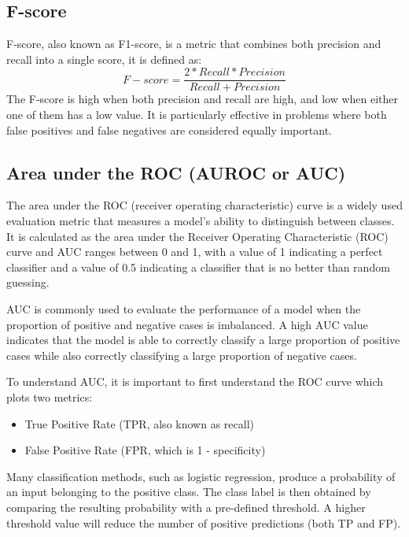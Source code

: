 \subsection{F-score}
F-score, also known as F1-score, is a metric that combines both precision and recall into a single score, it is defined as:
\begin{equation}\label{eqn_Fscore}
  F-score = \frac{2*Recall*Precision}{Recall+Precision}
\end{equation}The F-score is high when both precision and recall are high, and low when either one of them has a low value. It is particularly effective in problems where both false positives and false negatives are considered equally important.
\newpage
\subsection{Area under the ROC (AUROC or AUC)}
The area under the ROC (receiver operating characteristic) curve is a widely used evaluation metric that measures a model's ability to distinguish between classes. It is calculated as the area under the Receiver Operating Characteristic (ROC) curve and AUC ranges between 0 and 1, with a value of 1 indicating a perfect classifier and a value of 0.5 indicating a classifier that is no better than random guessing.

AUC is commonly used to evaluate the performance of a model when the proportion of positive and negative cases is imbalanced. A high AUC value indicates that the model is able to correctly classify a large proportion of positive cases while also correctly classifying a large proportion of negative cases.

\noindent To understand AUC, it is important to first understand the ROC curve which plots two metrics:
\begin{itemize}
  \item True Positive Rate (TPR, also known as recall)
  \item False Positive Rate (FPR, which is 1 - specificity)
\end{itemize}

Many classification methods, such as logistic regression, produce a probability of an input belonging to the positive class. The class label is then obtained by comparing the resulting probability with a pre-defined threshold. A higher threshold value will reduce the number of positive predictions (both TP and FP).

